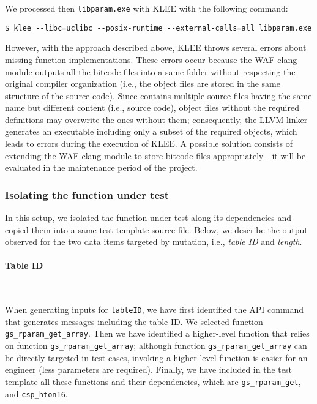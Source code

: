 We processed then \texttt{libparam.exe} with KLEE with the following command:

\begin{lstlisting}[style=CStyle]
$ klee --libc=uclibc --posix-runtime --external-calls=all libparam.exe
\end{lstlisting}

However, with the approach described above, KLEE throws several errors about missing function implementations. These errors occur because the WAF clang module outputs all the bitcode files into a same folder without respecting the original compiler organization (i.e., the object files are stored in the same structure of the source code). Since \PARAM contains multiple source files having the same name but different content (i.e., source code), object files without the required definitions may overwrite the ones without them; consequently, the LLVM linker generates an executable including only a subset of the required objects, which leads to errors during the execution of KLEE. A possible solution consists of extending the WAF clang module to store bitcode files appropriately - it will be evaluated in the maintenance period of the project.


\subsubsection{Isolating the function under test}

In this setup, we isolated the function under test along its dependencies and copied them into a same test template source file. Below, we describe the output observed for the two data items targeted by mutation, i.e.,
\emph{table ID} and \emph{length}.


\paragraph{Table ID}\

When generating inputs for \texttt{tableID}, we have first identified the API command that generates messages including the table ID. We selected function
\texttt{gs\_rparam\_get\_array}. Then we have identified a higher-level function that relies on function
\texttt{gs\_rparam\_get\_array}; although function \texttt{gs\_rparam\_get\_array} can be directly targeted in test cases, invoking a higher-level function is easier for an engineer (less parameters are required).
Finally, we have included in the test template all these functions and their dependencies, which are \texttt{gs\_rparam\_get}, and \texttt{csp\_hton16}.

